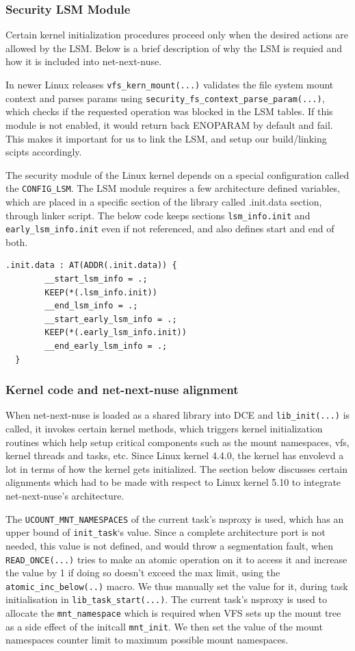 \documentclass{sig-alternate}
\begin{document}
\subsubsection{Security LSM Module}\label{Section_LSM}
Certain kernel initialization procedures proceed only when the desired actions are allowed by the LSM. Below is a brief description of why the LSM is requied and how 
it is included into net-next-nuse.

In newer Linux releases \texttt{vfs\_kern\_mount(...)} validates the file system mount context and parses params using \texttt{security\_fs\_context\_parse\_param(...)},
which checks if the requested operation was blocked in the LSM tables. If this module is not enabled, it would return back ENOPARAM by default and fail. This makes it 
important for us to link the LSM, and setup our build/linking scipts accordingly.

The security module of the Linux kernel depends on a special configuration called the \texttt{CONFIG\_LSM}. The LSM module requires a few architecture
defined variables, which are placed in a specific section
of the library called .init.data section, through linker script. 
The below code keeps sections \texttt{lsm\_info.init} and \texttt{early\_lsm\_info.init} even if not referenced, and also defines start and end of both.
\begin{lstlisting}[style=CStyle]  
  .init.data : AT(ADDR(.init.data)) {    
		__start_lsm_info = .;	
		KEEP(*(.lsm_info.init))
		__end_lsm_info = .;    
		__start_early_lsm_info = .;	
		KEEP(*(.early_lsm_info.init))
		__end_early_lsm_info = .;
  }
\end{lstlisting}

\subsubsection{Kernel code and net-next-nuse alignment}
When net-next-nuse is loaded as a shared library into DCE and \texttt{lib\_init(...)} is called, it invokes certain kernel methods, which triggers 
kernel initialization routines which help setup critical components such as the mount namespaces, vfs, kernel threads and tasks, etc. 
Since Linux kernel 4.4.0, the
kernel has envolevd a lot in terms of how the kernel gets initialized. The section below discusses certain alignments which had to be made with respect to 
Linux kernel 5.10 to integrate net-next-nuse's architecture.

The \texttt{UCOUNT\_MNT\_NAMESPACES} of the current task’s nsproxy is used, which has an upper bound of \texttt{init\_task}‘s value.  Since
a complete architecture port is not needed, this value is not defined, and
would throw a segmentation fault, when \texttt{READ\_ONCE(...)} tries to make
an atomic operation on it to access it and increase the value by 1 if doing so doesn’t exceed the max limit, using the \texttt{atomic\_inc\_below(..)} macro.
We thus manually set the value for it, during task initialisation in \texttt{lib\_task\_start(...)}. The current task's nsproxy is used to allocate the 
\texttt{mnt\_namespace} which is required when VFS sets up the mount tree as a side effect of the initcall \texttt{mnt\_init}. We then set the value of the 
mount namespaces counter  limit to maximum possible mount namespaces.
\end{document}
